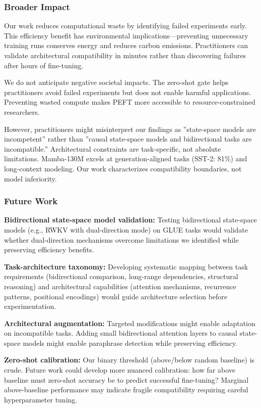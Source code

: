 \subsubsection{Broader Impact}

Our work reduces computational waste by identifying failed experiments early. This efficiency benefit has environmental implications---preventing unnecessary training runs conserves energy and reduces carbon emissions. Practitioners can validate architectural compatibility in minutes rather than discovering failures after hours of fine-tuning.

We do not anticipate negative societal impacts. The zero-shot gate helps practitioners avoid failed experiments but does not enable harmful applications. Preventing wasted compute makes PEFT more accessible to resource-constrained researchers.

However, practitioners might misinterpret our findings as ''state-space models are incompetent'' rather than ''causal state-space models and bidirectional tasks are incompatible.'' Architectural constraints are task-specific, not absolute limitations. Mamba-130M excels at generation-aligned tasks (SST-2: 81\%) and long-context modeling. Our work characterizes compatibility boundaries, not model inferiority.

\subsubsection{Future Work}

\textbf{Bidirectional state-space model validation:} Testing bidirectional state-space models (e.g., RWKV with dual-direction mode) on GLUE tasks would validate whether dual-direction mechanisms overcome limitations we identified while preserving efficiency benefits.

\textbf{Task-architecture taxonomy:} Developing systematic mapping between task requirements (bidirectional comparison, long-range dependencies, structural reasoning) and architectural capabilities (attention mechanisms, recurrence patterns, positional encodings) would guide architecture selection before experimentation.

\textbf{Architectural augmentation:} Targeted modifications might enable adaptation on incompatible tasks. Adding small bidirectional attention layers to causal state-space models might enable paraphrase detection while preserving efficiency.

\textbf{Zero-shot calibration:} Our binary threshold (above/below random baseline) is crude. Future work could develop more nuanced calibration: how far above baseline must zero-shot accuracy be to predict successful fine-tuning? Marginal above-baseline performance may indicate fragile compatibility requiring careful hyperparameter tuning.


